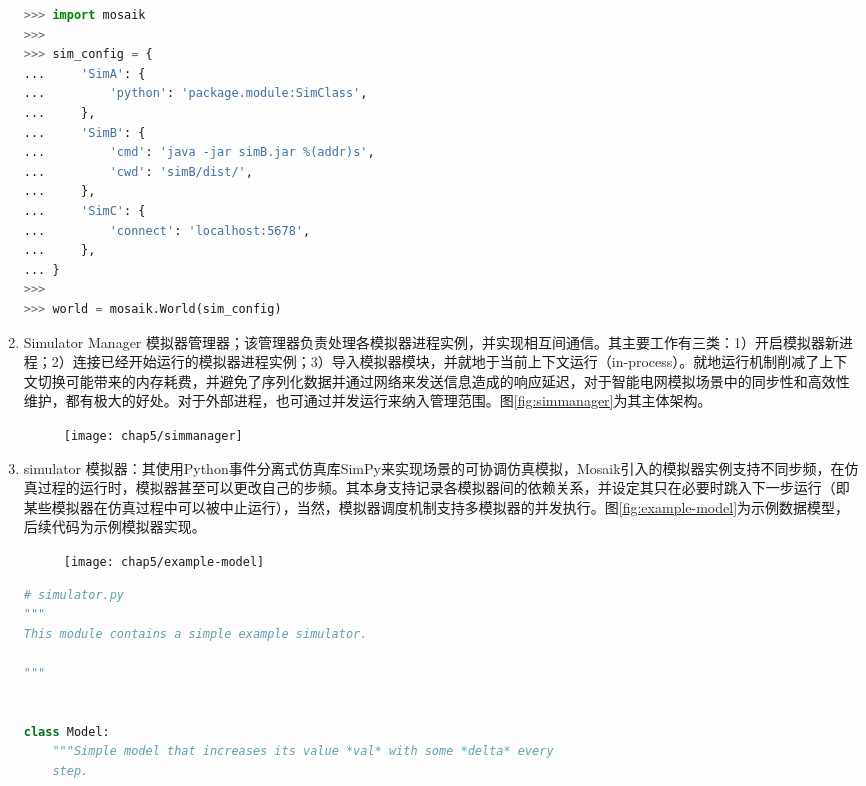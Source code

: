\begin{enumerate}
\begin{lstlisting}[language={Python}, caption={场景设置实例}]
\end{lstlisting}

\begin{lstlisting}[language={Python}, caption={模拟器元数据设置}]
>>> import mosaik
>>>
>>> sim_config = {
...     'SimA': {
...         'python': 'package.module:SimClass',
...     },
...     'SimB': {
...         'cmd': 'java -jar simB.jar %(addr)s',
...         'cwd': 'simB/dist/',
...     },
...     'SimC': {
...         'connect': 'localhost:5678',
...     },
... }
>>>
>>> world = mosaik.World(sim_config)
\end{lstlisting}

\item Simulator Manager 模拟器管理器；该管理器负责处理各模拟器进程实例，并实现相互间通信。其主要工作有三类：1）开启模拟器新进程；2）连接已经开始运行的模拟器进程实例；3）导入模拟器模块，并就地于当前上下文运行（in-process）。就地运行机制削减了上下文切换可能带来的内存耗费，并避免了序列化数据并通过网络来发送信息造成的响应延迟，对于智能电网模拟场景中的同步性和高效性维护，都有极大的好处。对于外部进程，也可通过并发运行来纳入管理范围。图\ref{fig:simmanager}为其主体架构。
    
\begin{figure}[!htp]
 \centering
 \texttt{[image: chap5/simmanager]}
\end{figure}

\item simulator 模拟器：其使用Python事件分离式仿真库SimPy来实现场景的可协调仿真模拟，Mosaik引入的模拟器实例支持不同步频，在仿真过程的运行时，模拟器甚至可以更改自己的步频。其本身支持记录各模拟器间的依赖关系，并设定其只在必要时跳入下一步运行（即某些模拟器在仿真过程中可以被中止运行），当然，模拟器调度机制支持多模拟器的并发执行。图\ref{fig:example-model}为示例数据模型，后续代码为示例模拟器实现。
    
\begin{figure}[!htp]
 \centering
 \texttt{[image: chap5/example-model]}
\end{figure}

\begin{lstlisting}[language={Python}, caption={示例模拟器实现}]
# simulator.py
"""
This module contains a simple example simulator.

"""


class Model:
    """Simple model that increases its value *val* with some *delta* every
    step.


\end{lstlisting}
\end{enumerate}
